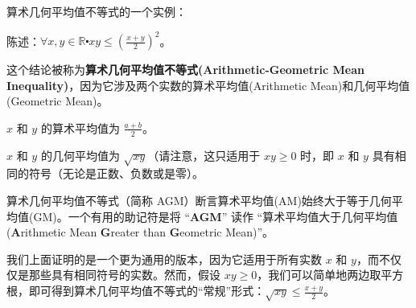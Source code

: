 \begin{center}
\noindent {}
\end{center}

\begin{example}
    算术几何平均值不等式的一个实例：
    \begin{center}
        陈述：$\forall x, y \in \mathbb{R} \centerdot xy \le (\frac{x+y}{2})^2$。
    \end{center}
    \begin{center}
        \noindent {}
    \end{center}
    这个结论被称为\textbf{算术几何平均值不等式(Arithmetic-Geometric Mean Inequality)}，因为它涉及两个实数的算术平均值(Arithmetic Mean)和几何平均值(Geometric Mean)。

    $x$ 和 $y$ 的算术平均值为 $\frac{a+b}{2}$。

    $x$ 和 $y$ 的几何平均值为 $\sqrt{xy}$（请注意，这只适用于 $xy \ge 0$ 时，即 $x$ 和 $y$ 具有相同的符号（无论是正数、负数或是零）。

    算术几何平均值不等式（简称 AGM）断言算术平均值(AM)始终大于等于几何平均值(GM)。一个有用的助记符是将 ``\textbf{AGM}'' 读作 ``算术平均值大于几何平均值(\textbf{A}rithmetic Mean \textbf{G}reater than \textbf{G}eometric Mean)''。

    我们上面证明的是一个更为通用的版本，因为它适用于所有实数 $x$ 和 $y$，而不仅仅是那些具有相同符号的实数。然而，假设 $xy \ge 0$，我们可以简单地两边取平方根，即可得到算术几何平均值不等式的``常规''形式：$\sqrt{xy} \le \frac{x+y}{2}$。
\end{example}

